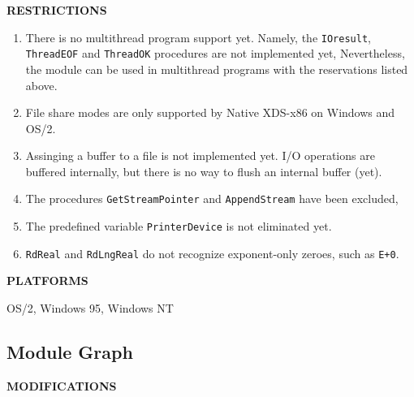 {\bf RESTRICTIONS}

\begin{enumerate}
\item There is no multithread program support yet. Namely, the \verb'IOresult',
      \verb'ThreadEOF' and \verb'ThreadOK' procedures are not implemented yet,
      Nevertheless, the module can be used in multithread programs with the
      reservations listed above.

\item File share modes are only supported by Native XDS-x86 on Windows and OS/2.

\item Assinging a buffer to a file is not implemented yet. I/O operations are
      buffered internally, but there is no way to flush an internal buffer (yet).

\item The procedures \verb'GetStreamPointer' and \verb'AppendStream' 
      have been excluded,

\item The predefined variable \verb'PrinterDevice' is not eliminated yet.

\item \verb'RdReal' and \verb'RdLngReal' do not recognize exponent-only zeroes,
      such as \verb'E+0'.
\end{enumerate}

{\bf PLATFORMS}

  OS/2, Windows 95, Windows NT


\subsection{Module Graph}

{\bf MODIFICATIONS}

